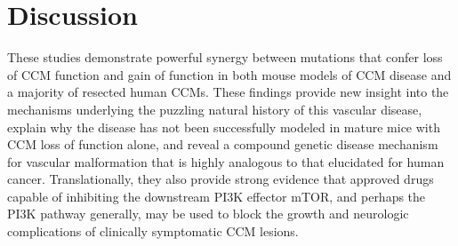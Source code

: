 \section{Discussion}
These studies demonstrate powerful synergy between mutations that confer loss of CCM function and gain of  function in both mouse models of CCM disease and a majority of resected human CCMs. These findings provide new insight into the mechanisms underlying the puzzling natural history of this vascular disease, explain why the disease has not been successfully modeled in mature mice with CCM loss of function alone, and reveal a compound genetic disease mechanism for vascular malformation that is highly analogous to that elucidated for human cancer. Translationally, they also provide strong evidence that approved drugs capable of inhibiting the downstream PI3K effector mTOR, and perhaps the PI3K pathway generally, may be used to block the growth and neurologic complications of clinically symptomatic CCM lesions.  

